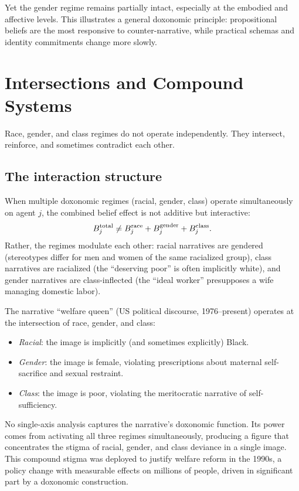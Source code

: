 Yet the gender regime remains partially intact, especially at the embodied and affective levels.
This illustrates a general doxonomic principle: propositional beliefs are the most responsive to counter-narrative, while practical schemas and identity commitments change more slowly.

\section{Intersections and Compound Systems}
\label{sec:ch24b-intersections}

Race, gender, and class regimes do not operate independently.
They intersect, reinforce, and sometimes contradict each other.

\subsection{The interaction structure}

\begin{remark}
\label{prop:intersection}
When multiple doxonomic regimes (racial, gender, class) operate simultaneously on agent $j$, the combined belief effect is not additive but interactive:
\[
  B_{j}^{\text{total}} \neq B_{j}^{\text{race}} + B_{j}^{\text{gender}} + B_{j}^{\text{class}}.
\]
Rather, the regimes modulate each other: racial narratives are gendered (stereotypes differ for men and women of the same racialized group), class narratives are racialized (the ``deserving poor'' is often implicitly white), and gender narratives are class-inflected (the ``ideal worker'' presupposes a wife managing domestic labor).
\end{remark}

\begin{example}
\label{ex:intersection}
The narrative ``welfare queen'' (US political discourse, 1976--present) operates at the intersection of race, gender, and class:
\begin{itemize}[nosep]
  \item \emph{Racial}: the image is implicitly (and sometimes explicitly) Black.
  \item \emph{Gender}: the image is female, violating prescriptions about maternal self-sacrifice and sexual restraint.
  \item \emph{Class}: the image is poor, violating the meritocratic narrative of self-sufficiency.
\end{itemize}
No single-axis analysis captures the narrative's doxonomic function.
Its power comes from activating all three regimes simultaneously, producing a figure that concentrates the stigma of racial, gender, and class deviance in a single image.
This compound stigma was deployed to justify welfare reform in the 1990s, a policy change with measurable effects on millions of people, driven in significant part by a doxonomic construction.
\end{example}

